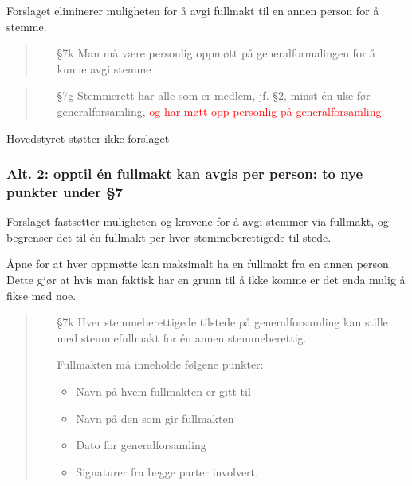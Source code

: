\documentclass[10pt,norsk,a4paper]{article}
\begin{document}
\begin{minipage}[t]{0.49\textwidth}
Forslaget eliminerer muligheten for å avgi fullmakt til en annen person for å stemme.

\begin{quote}
	\begin{enumerate}
		\item[§7k] Man må være personlig oppmøtt på generalformalingen for å kunne avgi stemme
	\end{enumerate}
\end{quote}

\begin{quote}
    \begin{enumerate}
        \item[§7g] Stemmerett har alle som er medlem, jf. §2, minst én uke før generalforsamling,
                  \textcolor{red}{og har møtt opp personlig på  generalforsamling}.
    \end{enumerate}
\end{quote}

Hovedstyret støtter ikke forslaget


\subsubsection{Alt. 2: opptil én fullmakt kan avgis per person: to nye punkter under §7}

Forslaget fastsetter muligheten og kravene for å avgi stemmer via fullmakt,
og begrenser det til én fullmakt per hver stemmeberettigede til stede.

Åpne for at hver oppmøtte kan maksimalt ha en fullmakt fra en annen person.
Dette gjør at hvis man faktisk har en grunn til å ikke komme er det enda mulig å fikse med noe.

\begin{quote}
    \begin{enumerate}
        \item[§7k]
            Hver stemmeberettigede tilstede på generalforsamling kan stille med
            stemmefullmakt for én annen  stemmeberettig.

            Fullmakten må inneholde følgene punkter:
            \begin{itemize}
                \item Navn på hvem fullmakten er gitt til
                \item Navn på den som gir fullmakten
                \item Dato for generalforsamling
                \item Signaturer fra begge parter involvert.
            \end{itemize}
    \end{enumerate}
\end{quote}


\end{minipage}
\end{document}
